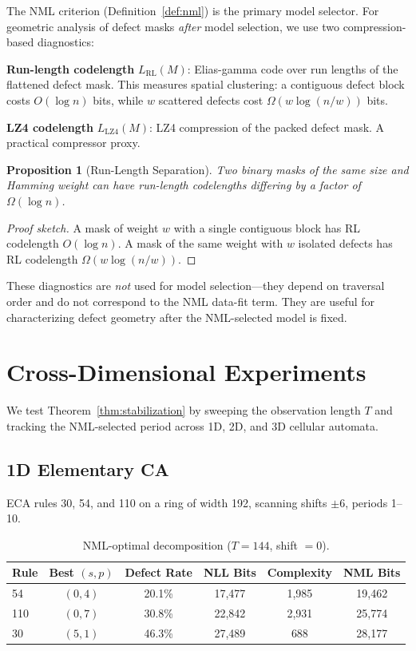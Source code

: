 \documentclass[11pt]{article}
\newtheorem{proposition}[theorem]{Proposition}
\theoremstyle{definition}
\theoremstyle{remark}
\newcommand{\RL}{\operatorname{RL}}
\begin{document}
The NML criterion (Definition~\ref{def:nml}) is the primary model selector.
For geometric analysis of defect masks \emph{after} model selection, we use two compression-based diagnostics:

\textbf{Run-length codelength} $L_{\RL}(M)$: Elias-gamma code over run lengths of the flattened defect mask.
This measures spatial clustering: a contiguous defect block costs $O(\log n)$ bits, while $w$ scattered defects cost $\Omega(w \log(n/w))$ bits.

\textbf{LZ4 codelength} $L_{\mathrm{LZ4}}(M)$: LZ4 compression of the packed defect mask.
A practical compressor proxy.

\begin{proposition}[Run-Length Separation]\label{prop:rl-separation}
Two binary masks of the same size and Hamming weight can have run-length codelengths differing by a factor of $\Omega(\log n)$.
\end{proposition}

\begin{proof}[Proof sketch]
A mask of weight $w$ with a single contiguous block has RL codelength $O(\log n)$.
A mask of the same weight with $w$ isolated defects has RL codelength $\Omega(w \log(n/w))$.
\end{proof}

These diagnostics are \emph{not} used for model selection---they depend on traversal order and do not correspond to the NML data-fit term.
They are useful for characterizing defect geometry after the NML-selected model is fixed.

\section{Cross-Dimensional Experiments}

We test Theorem~\ref{thm:stabilization} by sweeping the observation length $T$ and tracking the NML-selected period across 1D, 2D, and 3D cellular automata.

\subsection{1D Elementary CA}

ECA rules 30, 54, and 110 on a ring of width 192, scanning shifts $\pm 6$, periods 1--10.

\begin{table}[h]
\centering
\caption{NML-optimal decomposition ($T = 144$, shift $= 0$).}
\begin{tabular}{lccccc}
\toprule
Rule & Best $(s, p)$ & Defect Rate & NLL Bits & Complexity & NML Bits \\
\midrule
54  & $(0, 4)$ & 20.1\% & 17{,}477 & 1{,}985 & 19{,}462 \\
110 & $(0, 7)$ & 30.8\% & 22{,}842 & 2{,}931 & 25{,}774 \\
30  & $(5, 1)$ & 46.3\% & 27{,}489 & 688     & 28{,}177 \\
\bottomrule
\end{tabular}
\end{table}
\end{document}
